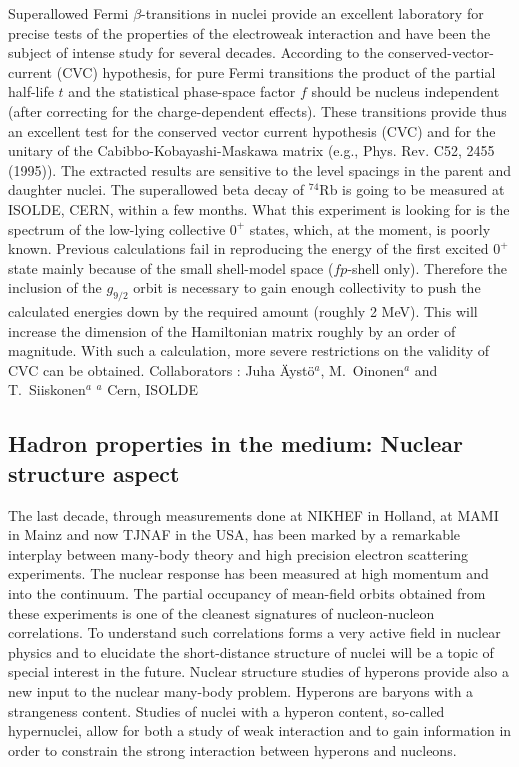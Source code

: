 Superallowed Fermi $\beta$-transitions in nuclei provide an 
excellent laboratory for precise tests of the properties of the
electroweak interaction and have been the subject of intense 
study for several decades. According to the conserved-vector-current
(CVC) hypothesis, for pure Fermi transitions the product of
the partial half-life $t$ and the statistical phase-space factor
$f$ should be nucleus independent (after correcting for the
charge-dependent effects). 
These transitions  provide thus   an excellent test for the conserved
vector current hypothesis (CVC) and for the unitary of the
Cabibbo-Kobayashi-Maskawa matrix (e.g., Phys. Rev. C52, 2455 (1995)). The
extracted results are sensitive to the level spacings in the parent and
daughter nuclei. The superallowed beta decay of $^{74}$Rb is going to be
measured at ISOLDE, CERN, within a few months.  What this experiment is
looking for is the spectrum of the low-lying collective $0^+$ states,
which, at the moment, is poorly known. Previous calculations fail in
reproducing the energy of the first excited $0^+$ state mainly because of
the small shell-model space ($fp$-shell only).  Therefore the inclusion of
the $g_{9/2}$ orbit is necessary to gain enough collectivity to push the
calculated energies down by the required amount (roughly 2 MeV). This will
increase the dimension of the Hamiltonian matrix roughly by an order of
magnitude. With such a calculation, more severe restrictions on the
validity of CVC can be obtained.
\newline
\newline
Collaborators : Juha \"Ayst\"o$^a$, M.\ Oinonen$^a$ and T.\ Siiskonen$^a$ \newline
${}^a$ Cern, ISOLDE\newline


\subsection{Hadron properties in the medium: Nuclear structure aspect}


The last decade, through measurements done at NIKHEF in
Holland, at MAMI in Mainz and now TJNAF in the USA, has been marked by a 
remarkable interplay between many-body theory and high precision 
electron scattering experiments.
The nuclear response has been measured at high momentum and 
into the continuum. The partial occupancy of mean-field orbits obtained
from these experiments is one
of the cleanest   signatures of nucleon-nucleon correlations.
To understand such correlations forms a very active field in nuclear physics
and to elucidate the short-distance structure of nuclei will be a topic
of special interest in the future. Nuclear structure studies of hyperons
provide also a new input to the nuclear many-body problem. Hyperons
are baryons with a strangeness content. Studies of nuclei with a 
hyperon content, so-called hypernuclei, allow for both a study of 
weak interaction and to gain information in order to constrain the 
strong interaction between hyperons and nucleons.            


